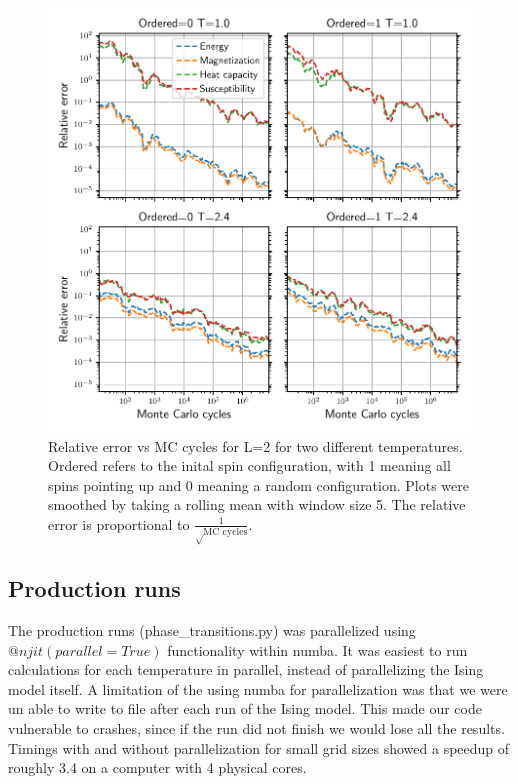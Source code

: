 \begin{figure}[H]
  \centering
  \includegraphics[width=\textwidth]{../figures/relative_error.pdf}
  \caption{Relative error vs MC cycles for L=2 for two different temperatures. Ordered
  refers to the inital spin configuration, with 1 meaning all spins pointing up and
  0 meaning a random configuration. Plots were smoothed by taking a
  rolling mean with window size 5. The relative error is proportional to
  $\frac{1}{\sqrt \text{MC cycles}}$.}
  \label{fig:error_L2}
\end{figure}


\subsection{Production runs}

The production runs (phase\_transitions.py) was parallelized using
$@njit(parallel=True)$ functionality within numba. It was easiest to run
calculations for each temperature in parallel, instead of parallelizing the
Ising model itself. A limitation of the using numba for parallelization was that
we were un able to write to file after each run of the Ising model. This made
our code vulnerable to crashes, since if the run
did not finish we would lose all the results. Timings with and without parallelization for small grid sizes showed a speedup
of roughly 3.4 on a computer with 4 physical cores.

